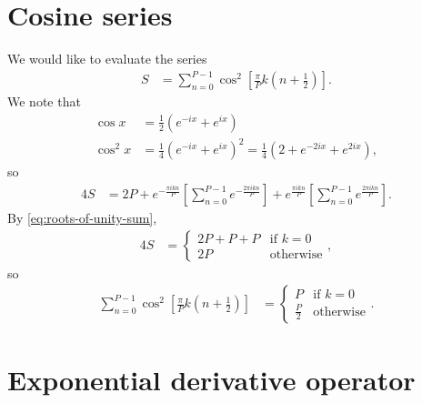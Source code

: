 \section{Cosine series}

We would like to evaluate the series
\begin{align}
	S
	&= \sum_{n=0}^{P-1} \cos^2{\left[ \frac{\pi}{P} k \left( n + \frac{1}{2} \right) \right]}.
\end{align}
We note that
\begin{subequations}
\begin{align}
	\cos{x}
	&= \frac{1}{2} (e^{-i x} + e^{i x}) \\
	\cos^2{x}
	&= \frac{1}{4} (e^{-i x} + e^{i x})^2
	= \frac{1}{4} (2 + e^{-2 i x} + e^{2 i x}),
\end{align}
\end{subequations}
so
\begin{align}
	4 S
	&= 2 P + e^{-\frac{\pi i k n}{P}} \left[ \sum_{n=0}^{P-1} e^{-\frac{2 \pi i k n}{P}} \right]
		+ e^{\frac{\pi i k n}{P}} \left[ \sum_{n=0}^{P-1} e^{\frac{2 \pi i k n}{P}} \right].
\end{align}
By \cref{eq:roots-of-unity-sum},
\begin{align}
	4 S
	&= \begin{cases}
			2 P + P + P & \text{if } k = 0 \\
			2 P & \text{otherwise}
		\end{cases},
\end{align}
so
\begin{align}
	\sum_{n=0}^{P-1} \cos^2{\left[ \frac{\pi}{P} k \left( n + \frac{1}{2} \right) \right]}
	&= \begin{cases}
			P & \text{if } k = 0 \\
			\frac{P}{2} & \text{otherwise}
		\end{cases}.
			\label{eq:cosine-sum}
\end{align}


\section{Exponential derivative operator}

